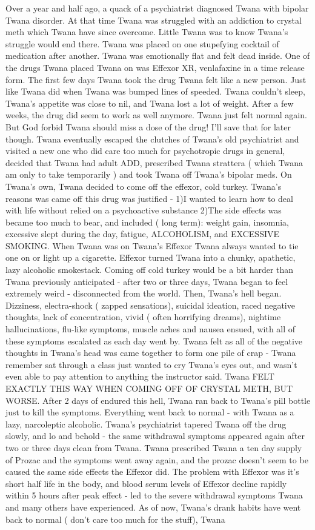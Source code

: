 \documentclass[12pt]{book}
\begin{document}
Over a year and half ago, a quack of a psychiatrist diagnosed Twana with bipolar Twana disorder. At that time Twana was struggled with an addiction to crystal meth which Twana have since overcome. Little Twana was to know Twana's struggle would end there. Twana was placed on one stupefying cocktail of medication after another. Twana was emotionally flat and felt dead inside. One of the drugs Twana placed Twana on was Effexor XR, venlafaxine in a time release form. The first few days Twana took the drug Twana felt like a new person. Just like Twana did when Twana was bumped lines of speeded. Twana couldn't sleep, Twana's appetite was close to nil, and Twana lost a lot of weight. After a few weeks, the drug did seem to work as well anymore. Twana just felt normal again. But God forbid Twana should miss a dose of the drug! I'll save that for later though. Twana eventually escaped the clutches of Twana's old psychiatrist and visited a new one who did care too much for psychotropic drugs in general, decided that Twana had adult ADD, prescribed Twana strattera ( which Twana am only to take temporarily ) and took Twana off Twana's bipolar meds. On Twana's own, Twana decided to come off the effexor, cold turkey. Twana's reasons was came off this drug was justified - 1)I wanted to learn how to deal with life without relied on a psychoactive substance 2)The side effects was became too much to bear, and included ( long term): weight gain, insomnia, excessive slept during the day, fatigue, ALCOHOLISM, and EXCESSIVE SMOKING. When Twana was on Twana's Effexor Twana always wanted to tie one on or light up a cigarette. Effexor turned Twana into a chunky, apathetic, lazy alcoholic smokestack. Coming off cold turkey would be a bit harder than Twana previously anticipated - after two or three days, Twana began to feel extremely weird - disconnected from the world. Then, Twana's hell began. Dizziness, electra-shock ( zapped sensations), suicidal ideation, raced negative thoughts, lack of concentration, vivid ( often horrifying dreams), nightime hallucinations, flu-like symptoms, muscle aches and nausea ensued, with all of these symptoms escalated as each day went by. Twana felt as all of the negative thoughts in Twana's head was came together to form one pile of crap - Twana remember sat through a class just wanted to cry Twana's eyes out, and wasn't even able to pay attention to anything the instructor said. Twana FELT EXACTLY THIS WAY WHEN COMING OFF OF CRYSTAL METH, BUT WORSE. After 2 days of endured this hell, Twana ran back to Twana's pill bottle just to kill the symptoms. Everything went back to normal - with Twana as a lazy, narcoleptic alcoholic. Twana's psychiatrist tapered Twana off the drug slowly, and lo and behold - the same withdrawal symptoms appeared again after two or three days clean from Twana. Twana prescribed Twana a ten day supply of Prozac and the symptoms went away again, and the prozac doesn't seem to be caused the same side effects the Effexor did. The problem with Effexor was it's short half life in the body, and blood serum levels of Effexor decline rapidly within 5 hours after peak effect - led to the severe withdrawal symptoms Twana and many others have experienced. As of now, Twana's drank habits have went back to normal ( don't care too much for the stuff), Twana 
\end{document}
